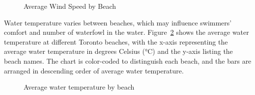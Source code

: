 \documentclass[
  letterpaper,
  DIV=11,
  numbers=noendperiod]{scrartcl}
\begin{document}
\begin{figure}


\caption{\label{fig-bar1}Average Wind Speed by Beach}

\end{figure}%

Water temperature varies between beaches, which may influence swimmers'
comfort and number of waterfowl in the water. Figure~\ref{fig-bar2}
shows the average water temperature at different Toronto beaches, with
the x-axis representing the average water temperature in degrees Celsius
(°C) and the y-axis listing the beach names. The chart is color-coded to
distinguish each beach, and the bars are arranged in descending order of
average water temperature.

\begin{figure}


\caption{\label{fig-bar2}Average water temperature by beach}

\end{figure}%
\end{document}
